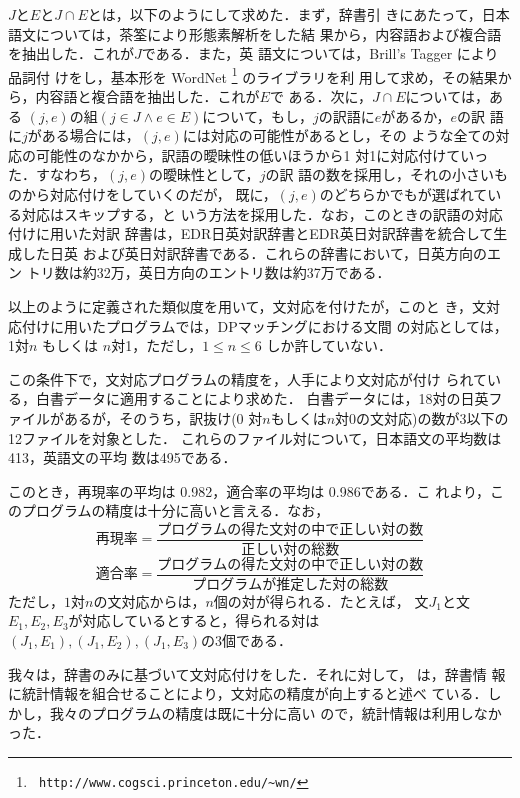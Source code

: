 $J$と$E$と$J \cap E$とは，以下のようにして求めた．まず，辞書引
きにあたって，日本語文については，茶筌により形態素解析をした結
果から，内容語および複合語を抽出した．これが$J$である．また，英
語文については，Brill's Tagger
\cite{brill92:_simpl_rule_based_part_speec_tagger}により品詞付
けをし，基本形を WordNet \footnote{{\tt
    http://www.cogsci.princeton.edu/\~{}wn/}}  のライブラリを利
用して求め，その結果から，内容語と複合語を抽出した．これが$E$で
ある．次に，$J \cap E$については，ある  $(j, e)$の組$(j \in J
\wedge e \in E)$について，もし，$j$の訳語に$e$があるか，$e$の訳
語に$j$がある場合には，$(j,e)$には対応の可能性があるとし，その
ような全ての対応の可能性のなかから，訳語の曖昧性の低いほうから1
対1に対応付けていった．すなわち，$(j,e)$の曖昧性として，$j$の訳
語の数を採用し，それの小さいものから対応付けをしていくのだが，
既に，$(j,e)$のどちらかでもが選ばれている対応はスキップする，と
いう方法を採用した．なお，このときの訳語の対応付けに用いた対訳
辞書は，EDR日英対訳辞書とEDR英日対訳辞書を統合して生成した日英
および英日対訳辞書である．これらの辞書において，日英方向のエン
トリ数は約32万，英日方向のエントリ数は約37万である．


以上のように定義された類似度を用いて，文対応を付けたが，このと
き，文対応付けに用いたプログラムでは，DPマッチングにおける文間
の対応としては，1対$n$ もしくは $n$対1，ただし，$1 \le n \le 6$ 
しか許していない．

この条件下で，文対応プログラムの精度を，人手により文対応が付け
られている，白書データ\cite{hakusho}に適用することにより求めた．
白書データには，18対の日英ファイルがあるが，そのうち，訳抜け(0
対$n$もしくは$n$対0の文対応)の数が3以下の12ファイルを対象とした．
これらのファイル対について，日本語文の平均数は413，英語文の平均
数は495である．

このとき，再現率の平均は 0.982，適合率の平均は 0.986である．こ
れより，このプログラムの精度は十分に高いと言える．なお，
\begin{displaymath}
  再現率 = \frac{プログラムの得た文対の中で正しい対の数}{正しい対の総数}
\end{displaymath}
\begin{displaymath}
  適合率 = \frac{プログラムの得た文対の中で正しい対の数}{プログラムが推定した対の総数}
\end{displaymath}
ただし，$1$対$n$の文対応からは，$n$個の対が得られる．たとえば，
文$J_1$と文$E_1, E_2, E_3$が対応しているとすると，得られる対は
$(J_1,E_1), (J_1,E_2), (J_1,E_3)$の3個である．

我々は，辞書のみに基づいて文対応付けをした．それに対して，
\cite{uturo94:_bilin_text_match_bilin_diction_statis}は，辞書情
報に統計情報を組合せることにより，文対応の精度が向上すると述べ
ている．しかし，我々のプログラムの精度は既に十分に高い
ので，統計情報は利用しなかった．

